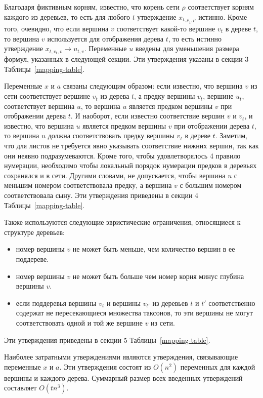 Благодаря фиктивным корням, известно, что корень сети $\rho$ соответствует корням каждого из деревьев, то есть для любого $t$ утверждение $x_{t,\rho_t,\rho}$ истинно.
Кроме того, очевидно, что если вершина $v$ соответствует какой-то вершине $v_t$ в дереве $t$, то вершина $v$ используется для отображения дерева $t$, то есть истинно утверждение $x_{t,v_t,v} \rightarrow u_{t,v}$.
Переменные $u$ введены для уменьшения размера формул, указанных в следующей секции.
Эти утверждения указаны в секции 3 Таблицы~\ref{mapping-table}.

Переменные $x$ и $a$ связаны следующим образом: если известно, что вершина $v$ из сети соответствует вершине $v_t$ из дерева $t$, а предку вершины $v_t$, вершине $u_t$, соответствует вершина $u$, то вершина $u$ является предком вершины $v$ при отображении дерева $t$.
И наоборот, если известно соответствие вершин $v$ и $v_t$, и известно, что вершина $u$ является предком вершины $v$ при отображении дерева $t$, то вершина $u$ должна соответствовать предку вершины $v_t$ в дереве $t$.
Заметим, что для листов не требуется явно указывать соответствие нижних вершин, так как они неявно подразумеваются.
Кроме того, чтобы удовлетворялось 4 правило нумерации, необходимо чтобы локальный порядок нумерации предков в деревьях сохранялся и в сети.
Другими словами, не допускается, чтобы вершина $u$ с меньшим номером соответствовала предку, а вершина $v$ с большим номером соответствовала сыну.
Эти утверждения приведены в секции 4 Таблицы~\ref{mapping-table}.

Также используются следующие эвристические ограничения, относящиеся к структуре деревьев:

\begin{itemize}
	\item номер вершины $v$ не может быть меньше, чем количество вершин в ее поддереве.
	\item номер вершины $v$ не может быть больше чем номер корня минус глубина вершины $v$.
	\item если поддеревья вершины $v_t$ и вершины $v_{t'}$ из деревьев $t$ и $t'$ соответственно содержат не пересекающиеся множества таксонов, то эти вершины не могут соответствовать одной и той же вершине $v$ из сети.
\end{itemize}

Эти утверждения приведены в секции 5 Таблицы~\ref{mapping-table}.

Наиболее затратными утверждениями являются утверждения, связывающие переменные $x$ и $a$.
Эти утверждения состоят из $O(n^2)$ переменных для каждой вершины и каждого дерева.
Суммарный размер всех введенных утверждений составляет $O(tn^3)$.

